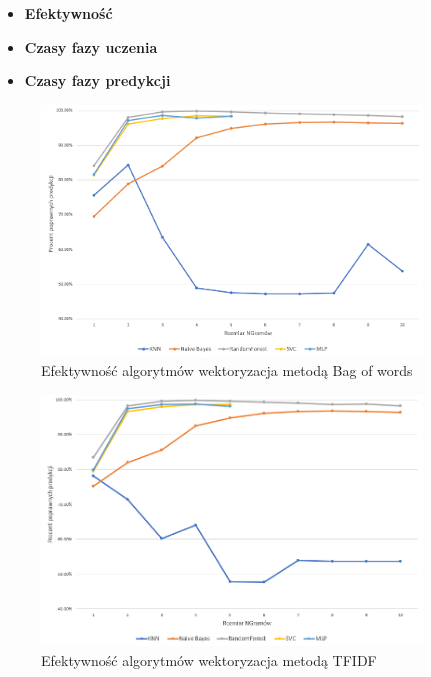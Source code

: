 \begin{itemize}
    \item \textbf{Efektywność}
    
    \item \textbf{Czasy fazy uczenia}
    
    \item \textbf{Czasy fazy predykcji}
    
\end{itemize}
\begin{figure}[h!]
    \centering
    \includegraphics[width=0.9\textwidth]{./Img/BOWAcc.png}
    \caption{Efektywność algorytmów wektoryzacja metodą Bag of words}
\end{figure}

\begin{figure}[h!]
    \centering
    \includegraphics[width=0.9\textwidth]{./Img/TFIDFAcc.png}
    \caption{Efektywność algorytmów wektoryzacja metodą TFIDF}
\end{figure}

